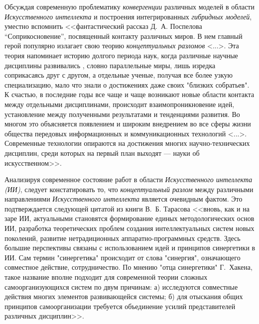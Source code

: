 Обсуждая современную проблематику \textit{конвергенции} различных моделей в области \textit{Искусственного интеллекта} и построения интегрированных \textit{гибридных моделей}, уместно вспомнить <<фантастический рассказ Д.~А. Поспелова ``Соприкосновение'', посвященный контакту различных миров. В нем главный герой популярно излагает свою теорию \textit{концептуальных разломов} <...>. Эта теория напоминает историю долгого периода  наук, когда различные научные дисциплины развивались , словно параллельные миры, лишь изредка соприкасаясь друг с другом, а отдельные ученые, получая все более узкую специализацию, мало что знали о достижениях даже своих "близких собратьев". К счастью, в последние годы все чаще и чаще возникают новые области контакта между отдельными дисциплинами, происходит взаимопроникновение идей, установление  между полученными результатами и тенденциями развития. Во многом это объясняется появлением и широким внедрением во все сферы жизни общества передовых информационных и коммуникационных технологий <...>. Современные технологии опираются на достижения многих научно-технических дисциплин, среди которых на первый план выходят  --- науки об искусственном>>.
\begin{SCn}
\end{SCn}

Анализируя современное состояние работ в области \textit{Искусственного интеллекта (ИИ)}, следует констатировать то, что \textit{концептуальный разлом} между различными направлениями \textit{Искусственного интеллекта} является очевидным фактом. Это подтверждается следующей цитатой из книги В.~Б. Тарасова  <<вновь, как и на заре ИИ, актуальными становятся формирование единых методологических основ ИИ, разработка теоретических проблем создания интеллектуальных систем новых поколений, развитие нетрадиционных аппаратно-программных средств. Здесь большие перспективы связаны с использованием идей и принципов синергетики в ИИ. Сам термин "синергетика"{} происходит от слова "синергия"{}, означающего совместное действие, сотрудничество. По мнению "отца синергетики"{} Г.~Хакена, такое название вполне подходит для современной теории сложных самоорганизующихся систем по двум причинам: а) исследуются совместные действия многих элементов развивающейся системы; б) для отыскания общих принципов самоорганизации требуется объединение усилий представителей различных дисциплин>>.
\begin{SCn}
\end{SCn}


